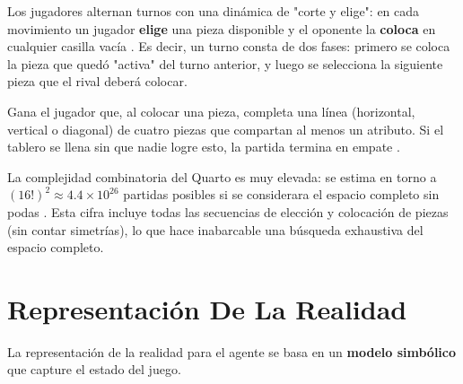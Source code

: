 \documentclass[conference]{IEEEtran}
\begin{document}
Los jugadores alternan turnos con una dinámica de "corte y elige": en cada movimiento un jugador \textbf{elige} una pieza disponible y el oponente la \textbf{coloca} en cualquier casilla vacía \cite{santana2012}. Es decir, un turno consta de dos fases: primero se coloca la pieza que quedó "activa" del turno anterior, y luego se selecciona la siguiente pieza que el rival deberá colocar.

Gana el jugador que, al colocar una pieza, completa una línea (horizontal, vertical o diagonal) de cuatro piezas que compartan al menos un atributo. Si el tablero se llena sin que nadie logre esto, la partida termina en empate \cite{muller2009}.



La complejidad combinatoria del Quarto es muy elevada: se estima en torno a $(16!)^2 \approx 4.4 \times 10^{26}$ partidas posibles si se considerara el espacio completo sin podas \cite{santana2012}. Esta cifra incluye todas las secuencias de elección y colocación de piezas (sin contar simetrías), lo que hace inabarcable una búsqueda exhaustiva del espacio completo.



\section{Representación De La Realidad}

La representación de la realidad para el agente se basa en un \textbf{modelo simbólico} que capture el estado del juego.
\end{document}
